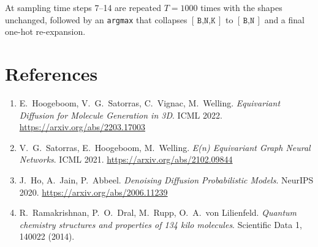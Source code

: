 \documentclass[11pt,a4paper]{article}
\newcommand{\shape}[1]{\ensuremath{[\,\texttt{#1}\,]}}
\newcommand{\code}[1]{\texttt{#1}}
\begin{document}
\noindent
At sampling time steps 7--14 are repeated $T=1000$ times with the shapes
unchanged, followed by an \code{argmax} that collapses \shape{B,N,K} to
\shape{B,N} and a final one-hot re-expansion.

\section*{References}
\begin{enumerate}[leftmargin=1.6em]
\item E.~Hoogeboom, V.~G.~Satorras, C.~Vignac, M.~Welling.
      \emph{Equivariant Diffusion for Molecule Generation in 3D}. ICML 2022.
      \url{https://arxiv.org/abs/2203.17003}
\item V.~G.~Satorras, E.~Hoogeboom, M.~Welling.
      \emph{E(n) Equivariant Graph Neural Networks}. ICML 2021.
      \url{https://arxiv.org/abs/2102.09844}
\item J.~Ho, A.~Jain, P.~Abbeel.
      \emph{Denoising Diffusion Probabilistic Models}. NeurIPS 2020.
      \url{https://arxiv.org/abs/2006.11239}
\item R.~Ramakrishnan, P.~O.~Dral, M.~Rupp, O.~A.~von Lilienfeld.
      \emph{Quantum chemistry structures and properties of 134 kilo molecules}.
      Scientific Data 1, 140022 (2014).
\end{enumerate}
\end{document}
